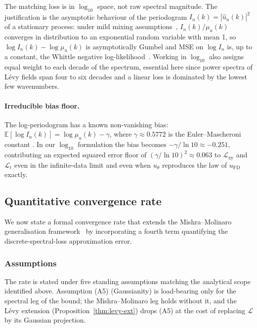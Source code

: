 \documentclass[review,12pt]{elsarticle}
\begin{document}
The matching loss is in \(\log_{10}\) space, not raw spectral
magnitude. The justification is the asymptotic behaviour of the
periodogram \(I_n(k) = |\widehat u_n(k)|^2\) of a stationary
process: under mild mixing
assumptions~\cite{Brillinger1981,Dahlhaus1996},
\(I_n(k) / \mu_u(k)\) converges in distribution to an exponential
random variable with mean 1, so \(\log I_n(k) - \log \mu_u(k)\)
is asymptotically Gumbel and MSE on \(\log I_n\) is, up to a
constant, the Whittle negative
log-likelihood~\cite{Whittle1953}. Working in \(\log_{10}\) also
assigns equal weight to each decade of the spectrum, essential
here since power spectra of L\'evy fields span four to six
decades and a linear loss is dominated by the lowest few
wavenumbers.

\paragraph{Irreducible bias floor.}
The log-periodogram has a known non-vanishing bias:
\(\mathbb E[\log I_n(k)] = \log \mu_u(k) - \gamma\),
where \(\gamma \approx 0.5772\) is the Euler--Mascheroni constant
\cite{Brillinger1981}. In our \(\log_{10}\) formulation the bias
becomes \(-\gamma/\ln 10 \approx -0.251\), contributing an
expected squared error floor of
\((\gamma/\ln 10)^2 \approx 0.063\) to
\(\mathcal L_{\mathrm{xy}}\) and \(\mathcal L_{\mathrm{t}}\) even
in the infinite-data limit and even when \(u_\theta\) reproduces
the law of \(u_{\mathrm{FD}}\) exactly.

\subsection{Quantitative convergence rate}
\label{subsec:convergence}

We now state a formal convergence rate that extends the
Mishra--Molinaro generalisation framework~\cite{MishraMolinaro2022}
by incorporating a fourth term quantifying the discrete-spectral-loss
approximation error.

\subsubsection{Assumptions}

The rate is stated under five standing assumptions matching the
analytical scope identified above. Assumption (A5) (Gaussianity) is
load-bearing only for the spectral leg of the bound; the
Mishra--Molinaro leg holds without it, and the L\'evy extension
(Proposition~\ref{thm:levy-ext}) drops (A5) at the cost of replacing
\(\mathcal L\) by its Gaussian projection.
\end{document}
